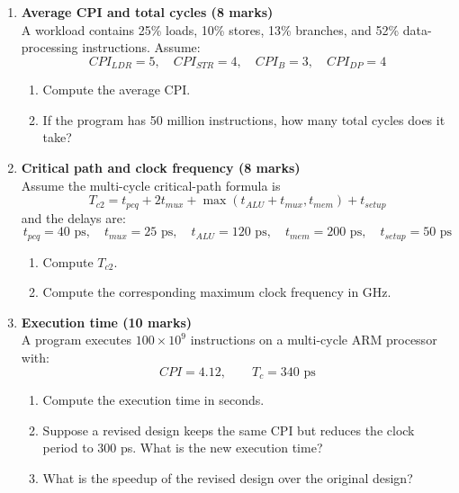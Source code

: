 \documentclass[11pt]{article}
\begin{document}
\begin{enumerate}[label=\textbf{B\arabic*.}]
  \item \textbf{Average CPI and total cycles (8 marks)}\\
  A workload contains 25\% loads, 10\% stores, 13\% branches, and 52\% data-processing instructions.
  Assume:
  \[
    CPI_{LDR}=5,\quad CPI_{STR}=4,\quad CPI_B=3,\quad CPI_{DP}=4
  \]
  \begin{enumerate}[label=(\alph*)]
    \item Compute the average CPI.
    \item If the program has 50 million instructions, how many total cycles does it take?
  \end{enumerate}

  \item \textbf{Critical path and clock frequency (8 marks)}\\
  Assume the multi-cycle critical-path formula is
  \[
    T_{c2} = t_{pcq} + 2t_{mux} + \max(t_{ALU} + t_{mux}, t_{mem}) + t_{setup}
  \]
  and the delays are:
  \[
    t_{pcq}=40\text{ ps},\quad t_{mux}=25\text{ ps},\quad
    t_{ALU}=120\text{ ps},\quad t_{mem}=200\text{ ps},\quad
    t_{setup}=50\text{ ps}
  \]
  \begin{enumerate}[label=(\alph*)]
    \item Compute \(T_{c2}\).
    \item Compute the corresponding maximum clock frequency in GHz.
  \end{enumerate}

  \item \textbf{Execution time (10 marks)}\\
  A program executes \(100 \times 10^9\) instructions on a multi-cycle ARM processor with:
  \[
    CPI = 4.12,\qquad T_c = 340\text{ ps}
  \]
  \begin{enumerate}[label=(\alph*)]
    \item Compute the execution time in seconds.
    \item Suppose a revised design keeps the same CPI but reduces the clock period to \(300\) ps. What is the new execution time?
    \item What is the speedup of the revised design over the original design?
  \end{enumerate}
\end{enumerate}
\end{document}
